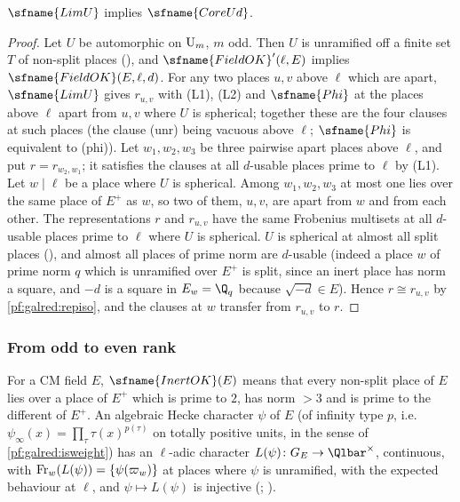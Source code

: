 \begin{theorem}\label{pf:galred:joinU}
$\sfname{LimU}$ implies $\sfname{CoreUd}$.
\end{theorem}

\begin{proof}
Let $U$ be automorphic on $\mathrm{U}_m$, $m$ odd. Then $U$ is unramified off a finite set $T$ of non-split places
(), and $\sfname{FieldOK}'(\ell,E)$ implies $\sfname{FieldOK}(E,\ell,d)$. For
any two places $u,v$ above $\ell$ which are apart, $\sfname{LimU}$ gives $r_{u,v}$ with (L1), (L2) and $\sfname{Phi}$ at the
places above $\ell$ apart from $u,v$ where $U$ is spherical; together these are the four clauses at such places (the clause
(unr) being vacuous above $\ell$; $\sfname{Phi}$ is equivalent to (phi)). Let $w_1,w_2,w_3$ be three pairwise apart places
above $\ell$, and put $r=r_{w_2,w_1}$; it satisfies the clauses at all $d$-usable places prime to $\ell$ by (L1).
Let $w\mid\ell$ be a place where $U$ is spherical. Among $w_1,w_2,w_3$ at most one lies over the same place of $E^+$ as $w$,
so two of them, $u,v$, are apart from $w$ and from each other. The representations $r$ and $r_{u,v}$ have the same Frobenius
multisets at all $d$-usable places prime to $\ell$ where $U$ is spherical. $U$ is spherical at almost all split places
(), and almost all places of prime norm are $d$-usable (indeed a place $w$ of prime norm $q$ which is unramified over $E^+$ is split,
since an inert place has norm a square, and $-d$ is a square in $E_w=\Q_q$ because $\sqrt{-d}\in E$). Hence $r\cong r_{u,v}$ by
\cref{pf:galred:repiso}, and the clauses at $w$ transfer from $r_{u,v}$ to $r$.
\end{proof}

\subsubsection{From odd to even rank}\label{sec:pf:galred:twoup}

For a CM field $E$, $\sfname{InertOK}(E)$ means that every non-split place of $E$ lies over a place of $E^+$ which is prime to
$2$, has norm $>3$ and is prime to the different of $E^+$. An algebraic Hecke character $\psi$ of $E$ (of infinity type
$p$, i.e.\ $\psi_\infty(x)=\prod_\tau\tau(x)^{p(\tau)}$ on totally positive units, in the sense of
\cref{pf:galred:isweight}) has an $\ell$-adic character $L(\psi)\colon G_E\to\Qlbar^\times$, continuous, with
$\operatorname{Fr}_w(L(\psi))=\{\psi(\varpi_w)\}$ at places where $\psi$ is unramified, with the expected behaviour at $\ell$, and
$\psi\mapsto L(\psi)$ is injective (\cite{Serre1968}; ).


